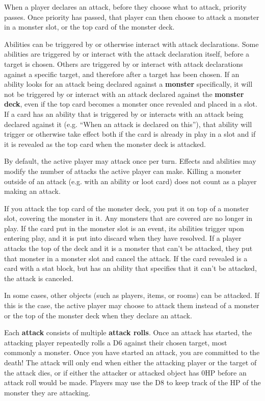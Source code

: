 \documentclass[10pt, a4paper, twoside]{article} %
\begin{document}
    When a player declares an attack, before they choose what to attack, priority passes. Once priority has passed, that player can then choose to attack a monster in a monster slot, or the top card of the monster deck.

    Abilities can be triggered by or otherwise interact with attack declarations. Some abilities are triggered by or interact with the attack declaration itself, before a target is chosen. Others are triggered by or interact with attack declarations against a specific target, and therefore after a target has been chosen. If an ability looks for an attack being declared against a \textbf{monster} specifically, it will not be triggered by or interact with an attack declared against the \textbf{monster deck}, even if the top card becomes a monster once revealed and placed in a slot. If a card has an ability that is triggered by or interacts with an attack being declared against it (e.g. “When an attack is declared on this”), that ability will trigger or otherwise take effect both if the card is already in play in a slot and if it is revealed as the top card when the monster deck is attacked.

    By default, the active player may attack once per turn. Effects and abilities may modify the number of attacks the active player can make. Killing a monster outside of an attack (e.g. with an ability or loot card) does not count as a player making an attack.

    If you attack the top card of the monster deck, you put it on top of a monster slot, covering the monster in it. Any monsters that are covered are no longer in play. If the card put in the monster slot is an event, its abilities trigger upon entering play, and it is put into discard when they have resolved. If a player attacks the top of the deck and it is a monster that can’t be attacked, they put that monster in a monster slot and cancel the attack. If the card revealed is a card with a stat block, but has an ability that specifies that it can’t be attacked, the attack is canceled.

    In some cases, other objects (such as players, items, or rooms) can be attacked. If this is the case, the active player may choose to attack them instead of a monster or the top of the monster deck when they declare an attack.

    Each \textbf{attack} consists of multiple \textbf{attack rolls}. Once an attack has started, the attacking player repeatedly rolls a D6 against their chosen target, most commonly a monster. Once you have started an attack, you are committed to the death! The attack will only end when either the attacking player or the target of the attack dies, or if either the attacker or attacked object has 0HP before an attack roll would be made. Players may use the D8 to keep track of the HP of the monster they are attacking.
\end{document}
